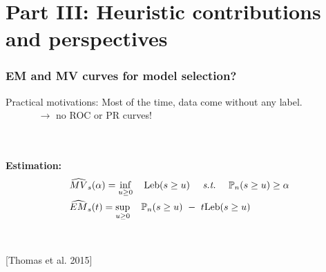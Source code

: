 \documentclass[9pt]{beamer}
\newcommand{\st}{\text{\emph{s.t.}}{}}
\newcommand{\crit}{\mathcal{C}}
\def\leb{\text{Leb}}
\begin{document}
\section{Part III: Heuristic contributions and perspectives}


\begin{frame}
\frametitle{EM and MV curves for model selection?}





\begin{block}{Practical motivations:}
Most of the time, data come without any label.\\
{\footnotesize ~~~~~~ $\to$ no ROC or PR curves!}
\end{block}
~\\~\\

\textbf{Estimation:}
{\small
\begin{align*}
&\widehat{MV}_s(\alpha) = \inf_{u \ge 0} ~~~\leb(s \ge u) ~~~~\st~~~~ \mathbb{P}_n(s \ge u) \ge \alpha\\%
&\widehat{EM}_s(t) = \sup_{u \ge 0} ~~~\mathbb{P}_n(s \ge u) ~-~ t \leb(s \ge u)%
\end{align*}
}
~\\~\\
{\small [Thomas et al. 2015]}\\


\end{frame}
\end{document}
